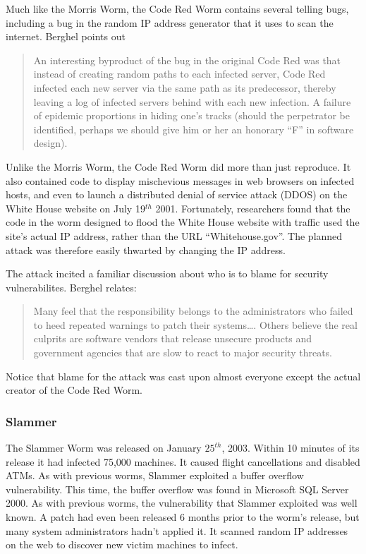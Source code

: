 Much like the Morris Worm, the Code Red Worm contains several telling bugs,
including a bug in the random IP address generator that it uses to scan the internet.
Berghel\cite{berghel_code_2001} points out
\begin{quote}
An interesting byproduct of the bug in the original Code Red was that instead 
of creating random paths to each infected server, Code Red infected each new
server via the same path as its predecessor, thereby leaving a log of infected
servers behind with each new infection. A failure of epidemic proportions in
hiding one's tracks (should the perpetrator be identified, perhaps we should
give him or her an honorary ``F'' in software design).
\end{quote}

Unlike the Morris Worm, the Code Red Worm did more than just reproduce. It also
contained code to display mischevious messages in web browsers on infected
hosts, and even to launch a distributed denial of service attack (DDOS) on the White
House website on July 19$^{th}$ 2001. Fortunately, researchers found that
the code in the worm designed to flood the White House website with traffic used
the site's actual IP address, rather than the URL ``Whitehouse.gov''. The planned
attack was therefore easily thwarted by changing the IP
address\cite{berghel_code_2001}.

The attack incited a familiar discussion about who is to blame for security
vulnerabilites. Berghel\cite{berghel_code_2001} relates:
\begin{quote}
Many feel that the responsibility belongs to the administrators who failed to
heed repeated warnings to patch their systems\ldots.
Others believe the real culprits are software vendors that release unsecure
products and government agencies that are slow to react to major security threats.
\end{quote}

Notice that blame for the attack was cast upon almost everyone
except the actual creator of the Code Red Worm.

\subsubsection*{Slammer}
The Slammer Worm was released on January $25^{th}$, 2003. Within 10 minutes of
its release it had infected 75,000 machines. It caused
flight cancellations and disabled ATMs. As with previous worms, Slammer
exploited a buffer overflow vulnerability. This time, the buffer overflow was
found in Microsoft SQL Server 2000.
As with previous worms, the vulnerability that Slammer exploited was well known. A
patch had even been released 6 months prior to the worm's release, but many
system administrators hadn't applied it. It scanned random IP addresses on the
web to discover new victim machines to
infect\cite{tynan_dawn_2003}\cite{panko_slammer:_2003}.


